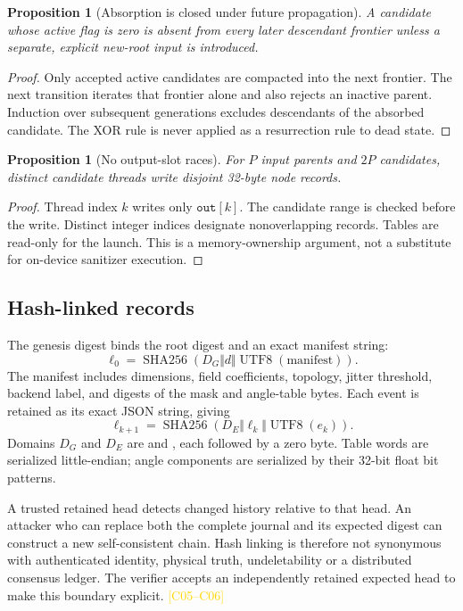 \documentclass[11pt,a4paper]{article}
\newcommand{\corr}[1]{\textcolor{gold}{\textsf{[#1]}}}
\newcommand{\code}[1]{\texttt{\detokenize{#1}}}
\newcommand{\sha}{\operatorname{SHA256}}
\newtheorem{proposition}[theorem]{Proposition}
\begin{document}
\begin{proposition}[Absorption is closed under future propagation]
A candidate whose active flag is zero is absent from every later descendant frontier unless a separate, explicit new-root input is introduced.
\end{proposition}
\begin{proof}
Only accepted active candidates are compacted into the next frontier. The next transition iterates that frontier alone and also rejects an inactive parent. Induction over subsequent generations excludes descendants of the absorbed candidate. The XOR rule is never applied as a resurrection rule to dead state.
\end{proof}

\begin{proposition}[No output-slot races]
For $P$ input parents and $2P$ candidates, distinct candidate threads write disjoint 32-byte node records.
\end{proposition}
\begin{proof}
Thread index $k$ writes only $\texttt{out}[k]$. The candidate range is checked before the write. Distinct integer indices designate nonoverlapping records. Tables are read-only for the launch. This is a memory-ownership argument, not a substitute for on-device sanitizer execution.
\end{proof}

\subsection{Hash-linked records}
The genesis digest binds the root digest and an exact manifest string:
\begin{equation}
 \ell_0=\sha(D_G\Vert d\Vert\operatorname{UTF8}(\text{manifest})).
\end{equation}
The manifest includes dimensions, field coefficients, topology, jitter threshold, backend label, and digests of the mask and angle-table bytes. Each event is retained as its exact JSON string, giving
\begin{equation}
 \ell_{k+1}=\sha(D_E\Vert\ell_k\Vert\operatorname{UTF8}(e_k)).
\end{equation}
Domains $D_G$ and $D_E$ are \code{atomOS:genesis:v2} and \code{atomOS:event:v2}, each followed by a zero byte. Table words are serialized little-endian; angle components are serialized by their 32-bit float bit patterns.

A trusted retained head detects changed history relative to that head. An attacker who can replace both the complete journal and its expected digest can construct a new self-consistent chain. Hash linking is therefore not synonymous with authenticated identity, physical truth, undeletability or a distributed consensus ledger. The verifier accepts an independently retained expected head to make this boundary explicit. \corr{C05--C06}
\clearpage
\end{document}
